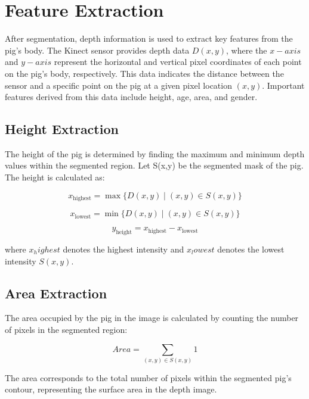 {\section{Feature Extraction}
After segmentation, depth information is used to extract key features from the pig’s body. The Kinect sensor provides depth data $D(x,y)$, where the $x-axis$ and $y-axis$ represent the horizontal and vertical pixel coordinates of each point on the pig’s body, respectively. This data indicates the distance between the sensor and a specific point on the pig at a given pixel location $(x,y)$. Important features derived from this data include height, age, area, and gender.

\subsection{Height Extraction}
The height of the pig is determined by finding the maximum and minimum depth values within the segmented region. Let S(x,y) be the segmented mask of the pig. The height is calculated as:

\myequation{}
\begin{equation}
	x_{\text{highest}} = \max\{D(x, y) \mid (x, y) \in S(x, y)\}
\end{equation}

\myequation{}
\begin{equation}
	x_{\text{lowest}} = \min\{D(x, y) \mid (x, y) \in S(x, y)\}
\end{equation}

\myequation{}
\begin{equation}
	y_{\text{height}} = x_{\text{highest}} - x_{\text{lowest}}
\end{equation}

where $x_highest$ denotes the highest intensity and $x_lowest$ denotes the lowest intensity $S(x,y)$.

\subsection{Area Extraction}
The area occupied by the pig in the image is calculated by counting the number of pixels in the segmented region:

\myequation{}
\begin{equation}
	Area= \sum_{(x, y) \in S(x, y)} 1
\end{equation}

The area corresponds to the total number of pixels within the segmented pig’s contour, representing the surface area in the depth image.

}
